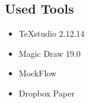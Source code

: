\subsection{Used Tools}

\begin{itemize}
	\item TeXstudio 2.12.14
	\item Magic Draw 19.0
	\item MockFlow
	\item Dropbox Paper
\end{itemize}
